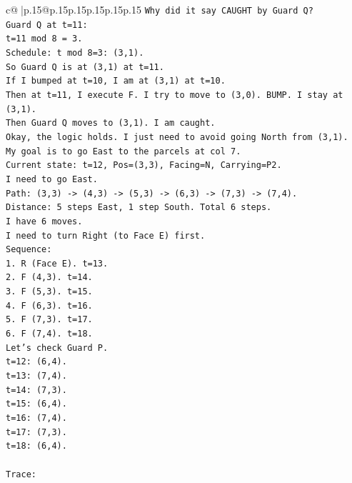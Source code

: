 \documentclass{article}
\begin{document}
{\begin{supertabular}{c@{$\;$}|p{.15\linewidth}@{}p{.15\linewidth}p{.15\linewidth}p{.15\linewidth}p{.15\linewidth}p{.15\linewidth}}
{{{\texttt{Why did it say CAUGHT by Guard Q?} \\
\texttt{Guard Q at t=11:} \\
\texttt{t=11 mod 8 = 3.} \\
\texttt{Schedule: t mod 8=3: (3,1).} \\
\texttt{So Guard Q is at (3,1) at t=11.} \\
\texttt{If I bumped at t=10, I am at (3,1) at t=10.} \\
\texttt{Then at t=11, I execute F. I try to move to (3,0). BUMP. I stay at (3,1).} \\
\texttt{Then Guard Q moves to (3,1). I am caught.} \\
\texttt{Okay, the logic holds. I just need to avoid going North from (3,1).} \\
\texttt{My goal is to go East to the parcels at col 7.} \\
\texttt{Current state: t=12, Pos=(3,3), Facing=N, Carrying=P2.} \\
\texttt{I need to go East.} \\
\texttt{Path: (3,3) {-}> (4,3) {-}> (5,3) {-}> (6,3) {-}> (7,3) {-}> (7,4).} \\
\texttt{Distance: 5 steps East, 1 step South. Total 6 steps.} \\
\texttt{I have 6 moves.} \\
\texttt{I need to turn Right (to Face E) first.} \\
\texttt{Sequence:} \\
\texttt{1. R (Face E). t=13.} \\
\texttt{2. F (4,3). t=14.} \\
\texttt{3. F (5,3). t=15.} \\
\texttt{4. F (6,3). t=16.} \\
\texttt{5. F (7,3). t=17.} \\
\texttt{6. F (7,4). t=18.} \\
\texttt{Let's check Guard P.} \\
\texttt{t=12: (6,4).} \\
\texttt{t=13: (7,4).} \\
\texttt{t=14: (7,3).} \\
\texttt{t=15: (6,4).} \\
\texttt{t=16: (7,4).} \\
\texttt{t=17: (7,3).} \\
\texttt{t=18: (6,4).} \\
\\ 
\texttt{Trace:} \\
}}}
\end{supertabular}}
\end{document}
